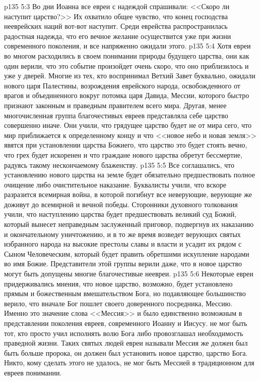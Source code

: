 \vs p135 5:3 Во дни Иоанна все евреи с надеждой спрашивали: <<Скоро ли наступит царство?>> Их охватило общее чувство, что конец господства нееврейских наций вот\hyp{}вот наступит. Среди еврейства распространилась радостная надежда, что его вечное желание осуществится уже при жизни современного поколения, и все напряженно ожидали этого.
\vs p135 5:4 Хотя евреи во многом расходились в своем понимании природы будущего царства, они как один верили, что это событие произойдет очень скоро, что оно приблизилось и уже у дверей. Многие из тех, кто воспринимал Ветхий Завет буквально, ожидали нового царя Палестины, возрождения еврейского народа, освобожденного от врагов и объединенного вокруг потомка царя Давида, Мессии, которого быстро признают законным и праведным правителем всего мира. Другая, менее многочисленная группа благочестивых евреев представляла себе царство совершенно иначе. Они учили, что грядущее царство будет не от мира сего, что мир приближается к определенному концу и что <<новое небо и новая земля>> явятся при установлении царства Божиего, что царство это будет стоять вечно, что грех будет искоренен и что граждане нового царства обретут бессмертие, радуясь такому нескончаемому блаженству.
\vs p135 5:5 Все соглашались, что установлению нового царства на земле будет обязательно предшествовать полное очищение либо очистительное наказание. Буквалисты учили, что вскоре разразится всемирная война, в которой погибнут все неверующие, верующие же доживут до всемирной и вечной победы. Сторонники духовного толкования учили, что наступлению царства будет предшествовать великий суд Божий, который вынесет неправедным заслуженный приговор, подвергнув их наказанию и окончательному уничтожению, и в то же время возведет верующих святых избранного народа на высокие престолы славы и власти и усадит их рядом с Сыном Человеческим, который будет править обретшими искупление народами во имя Божие. Представители этой группы верили даже, что в новое царство могут быть допущены многие благочестивые неевреи.
\vs p135 5:6 Некоторые евреи придерживались мнения, что новое царство, возможно, будет установлено прямым и божественным вмешательством Бога, но подавляющее большинство верило, что вначале Бог пошлет своего доверенного посредника, Мессию. Именно это значение слова <<Мессия>> и было единственно возможным в представлении поколения евреев, современного Иоанну и Иисусу.  не мог быть тот, кто просто учил исполнять волю Бога либо провозглашал необходимость праведной жизни. Таких святых людей евреи называли  Мессия же должен был быть больше пророка, он должен был установить новое царство, царство Бога. Никто, кому сделать этого не удалось, не мог быть Мессией в традиционном для евреев понимании.
